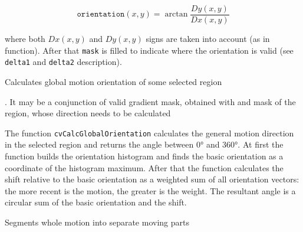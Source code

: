 \[
\texttt{orientation}(x,y)=\arctan{\frac{Dy(x,y)}{Dx(x,y)}}
\]

where both $Dx(x,y)$ and $Dy(x,y)$ signs are taken into account (as in  function). After that \texttt{mask} is filled to indicate where the orientation is valid (see \texttt{delta1} and \texttt{delta2} description).

\label{CalcGlobalOrientation}

Calculates global motion orientation of some selected region


\begin{description}
. It may be a conjunction of valid gradient mask, obtained with  and mask of the region, whose direction needs to be calculated
\end{description}

The function \texttt{cvCalcGlobalOrientation} calculates the general
motion direction in the selected region and returns the angle between
0° and 360°. At first the function builds the orientation histogram
and finds the basic orientation as a coordinate of the histogram
maximum. After that the function calculates the shift relative to the
basic orientation as a weighted sum of all orientation vectors: the more
recent is the motion, the greater is the weight. The resultant angle is
a circular sum of the basic orientation and the shift.

\label{SegmentMotion}

Segments whole motion into separate moving parts

